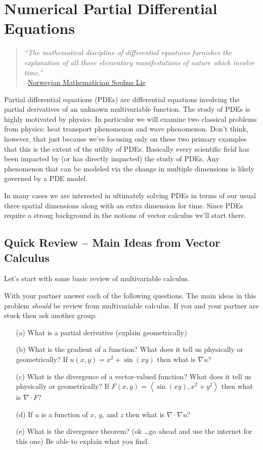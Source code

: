 \chapter{Numerical Partial Differential Equations}
\begin{quote}
    {\it ``The mathematical discipline of differential equations furnishes the explanation of
    all those elementary manifestations of nature which involve time.''} \\
    --\href{https://en.wikipedia.org/wiki/Sophus_Lie#Legacy}{Norwegian
    Mathematician Sophus Lie}
\end{quote}

Partial differential equations (PDEs) are differential equations involving the partial
derivatives of an unknown multivariable function.  The study of PDEs is highly
motivated by physics.  In particular we will examine two classical problems from physics:
heat transport phenomenon and wave phenomenon.  Don't think, however, that just because we're
focusing only on these two primary examples that this is the extent of the utility of
PDEs.  Basically every scientific field has been impacted by (or has directly impacted)
the study of PDEs.  Any phenomenon that can be modeled via the change in multiple
dimensions is likely governed by a PDE model.

In many cases we are interested in ultimately solving PDEs in terms of our usual three
spatial dimensions along with an extra dimension for time.  Since PDEs require a strong
background in the notions of vector calculus we'll start there.

\section{Quick Review -- Main Ideas from Vector Calculus}
Let's start with some basic review of multivariable calculus.
\begin{problem}
    With your partner answer each of the following questions. The main ideas in this
    problem {\it should} be review from multivariable calculus.  If you and your partner
    are stuck then ask another group. 
    \begin{enumerate}
        \item[(a)] What is a partial derivative (explain geometrically)
        \item[(b)] What is the gradient of a function? What does it tell us physically or geometrically? If
            $u(x,y)=x^2+\sin(xy)$ then what is $\nabla u$?
        \item[(c)] What is the divergence of a vector-valued function? What does it tell
            us physically or geometrically? If $F(x,y)=\left< \sin(xy), x^2+y^2\right>$
            then what is $\nabla \cdot F$?
        \item[(d)] If $u$ is a function of $x$, $y$, and $z$ then what is $\nabla \cdot
            \nabla u$?
        \item[(e)] What is the divergence theorem? (ok \ldots go ahead and use the
            internet for this one) Be able to explain what you find. 
    \end{enumerate}
\end{problem}

